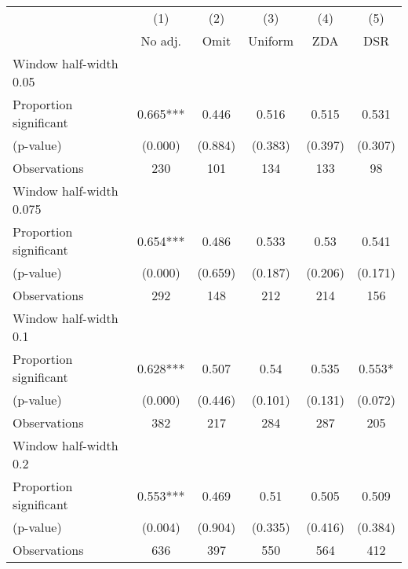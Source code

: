 
\def\sym#1{\ifmmode^{#1}\else\(^{#1}\)\fi}
\begin{tabular}{l*{5}{c}}
\hline\hline
& \multicolumn{1}{c}{(1)} &  \multicolumn{1}{c}{(2)} &  \multicolumn{1}{c}{(3)} &  \multicolumn{1}{c}{(4)} &  \multicolumn{1}{c}{(5)}\\
& \multicolumn{1}{c}{No adj.} &  \multicolumn{1}{c}{Omit} &  \multicolumn{1}{c}{Uniform} &  \multicolumn{1}{c}{ZDA} &  \multicolumn{1}{c}{DSR}\\

\hline
\hline
Window half-width 0.05\\

Proportion significant& 0.665*** &  0.446 &  0.516 &  0.515 &  0.531\\

(p-value) & (0.000) &  (0.884) &  (0.383) &  (0.397) &  (0.307)\\

Observations& 230 &  101 &  134 &  133 &  98\\

\hline
Window half-width 0.075\\

Proportion significant& 0.654*** &  0.486 &  0.533 &  0.53 &  0.541\\

(p-value) & (0.000) &  (0.659) &  (0.187) &  (0.206) &  (0.171)\\

Observations& 292 &  148 &  212 &  214 &  156\\

\hline
Window half-width 0.1\\

Proportion significant& 0.628*** &  0.507 &  0.54 &  0.535 &  0.553*\\

(p-value) & (0.000) &  (0.446) &  (0.101) &  (0.131) &  (0.072)\\

Observations& 382 &  217 &  284 &  287 &  205\\

\hline
Window half-width 0.2\\

Proportion significant& 0.553*** &  0.469 &  0.51 &  0.505 &  0.509\\

(p-value) & (0.004) &  (0.904) &  (0.335) &  (0.416) &  (0.384)\\

Observations& 636 &  397 &  550 &  564 &  412\\


\end{tabular}
